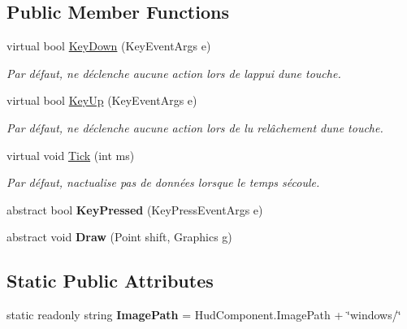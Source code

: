 \subsection*{Public Member Functions}
\begin{DoxyCompactItemize}
\item 
virtual bool \hyperlink{class_tentacle_slicers_1_1windows_1_1_windows_state_a16a1b0165062f4214e29966f58bce1d5}{Key\+Down} (Key\+Event\+Args e)
\begin{DoxyCompactList}\small\item\em Par défaut, ne déclenche aucune action lors de l\textquotesingle{}appui d\textquotesingle{}une touche. \end{DoxyCompactList}\item 
virtual bool \hyperlink{class_tentacle_slicers_1_1windows_1_1_windows_state_a9147d47b6d7f84f9d338499fa991b695}{Key\+Up} (Key\+Event\+Args e)
\begin{DoxyCompactList}\small\item\em Par défaut, ne déclenche aucune action lors de lu relâchement d\textquotesingle{}une touche. \end{DoxyCompactList}\item 
virtual void \hyperlink{class_tentacle_slicers_1_1windows_1_1_windows_state_a21040da05a02cf0bf9d8dfbdcbe5274d}{Tick} (int ms)
\begin{DoxyCompactList}\small\item\em Par défaut, n\textquotesingle{}actualise pas de données lorsque le temps s\textquotesingle{}écoule. \end{DoxyCompactList}\item 
\mbox{\label{class_tentacle_slicers_1_1windows_1_1_windows_state_abe9ebcc151e1d58f2b611f44069f2972}} 
abstract bool {\bfseries Key\+Pressed} (Key\+Press\+Event\+Args e)
\item 
\mbox{\label{class_tentacle_slicers_1_1windows_1_1_windows_state_ac2fcba7a0e84806db717373649288790}} 
abstract void {\bfseries Draw} (Point shift, Graphics g)
\end{DoxyCompactItemize}
\subsection*{Static Public Attributes}
\begin{DoxyCompactItemize}
\item 
\mbox{\label{class_tentacle_slicers_1_1windows_1_1_windows_state_ad7c650963ba3b760ed0eb8ede6950d86}} 
static readonly string {\bfseries Image\+Path} = Hud\+Component.\+Image\+Path + \char`\"{}windows/\char`\"{}
\end{DoxyCompactItemize}
